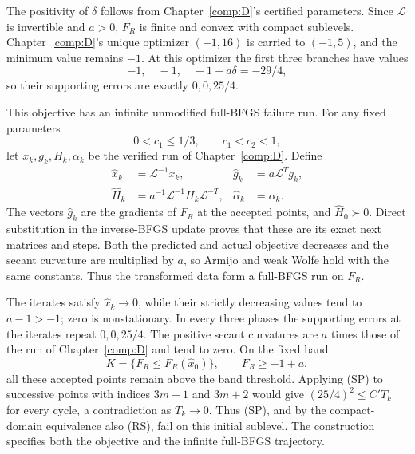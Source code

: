The positivity of $\delta$ follows from Chapter~\ref{comp:D}'s certified parameters. Since $\mathcal L$ is invertible and $a>0$, $F_R$ is finite and convex with compact sublevels. Chapter~\ref{comp:D}'s unique optimizer $(-1,16)$ is carried to $(-1,5)$, and the minimum value remains $-1$. At this optimizer the first three branches have values
\[
 -1,\quad-1,\quad -1-a\delta=-29/4,
\]
so their supporting errors are exactly $0,0,25/4$.

This objective has an infinite unmodified full-BFGS failure run. For any fixed parameters
\[
 0<c_1\le1/3,\qquad c_1<c_2<1,
\]
let $x_k,g_k,H_k,\alpha_k$ be the verified run of Chapter~\ref{comp:D}. Define
\[
 \begin{aligned}
 \widehat x_k&=\mathcal L^{-1}x_k,&
 \widehat g_k&=a\mathcal L^Tg_k,\\
 \widehat H_k&=a^{-1}\mathcal L^{-1}H_k\mathcal L^{-T},&
 \widehat\alpha_k&=\alpha_k.
 \end{aligned}
\]
The vectors $\widehat g_k$ are the gradients of $F_R$ at the accepted points, and $\widehat H_0\succ0$. Direct substitution in the inverse-BFGS update proves that these are its exact next matrices and steps. Both the predicted and actual objective decreases and the secant curvature are multiplied by $a$, so Armijo and weak Wolfe hold with the same constants. Thus the transformed data form a full-BFGS run on $F_R$.

The iterates satisfy $\widehat x_k\to0$, while their strictly decreasing values tend to $a-1>-1$; zero is nonstationary. In every three phases the supporting errors at the iterates repeat $0,0,25/4$. The positive secant curvatures are $a$ times those of the run of Chapter~\ref{comp:D} and tend to zero. On the fixed band
\[
 K=\{F_R\le F_R(\widehat x_0)\},\qquad
 F_R\ge -1+a,
\]
all these accepted points remain above the band threshold. Applying (SP) to successive points with indices $3m+1$ and $3m+2$ would give $(25/4)^2\le C'T_k$ for every cycle, a contradiction as $T_k\to0$. Thus (SP), and by the compact-domain equivalence also (RS), fail on this initial sublevel. The construction specifies both the objective and the infinite full-BFGS trajectory.


\setcounter{section}{4}
\setcounter{theorem}{0}
\setcounter{equation}{8}


